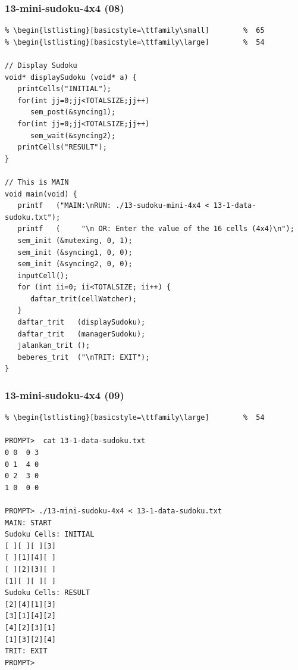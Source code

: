 \documentclass[aspectratio=169, xcolor=table, notheorems, hyperref={pdfpagelabels=false}]{beamer}
\begin{document}
\begin{frame}[fragile]
\frametitle{13-mini-sudoku-4x4 (08)}
\begin{lstlisting}[basicstyle=\ttfamily\tiny]         % 108
% \begin{lstlisting}[basicstyle=\ttfamily\footnotesize] %  72
% \begin{lstlisting}[basicstyle=\ttfamily\small]        %  65
% \begin{lstlisting}[basicstyle=\ttfamily\large]        %  54

// Display Sudoku
void* displaySudoku (void* a) {
   printCells("INITIAL");
   for(int jj=0;jj<TOTALSIZE;jj++) 
      sem_post(&syncing1);
   for(int jj=0;jj<TOTALSIZE;jj++) 
      sem_wait(&syncing2);
   printCells("RESULT");
}

// This is MAIN
void main(void) {
   printf   ("MAIN:\nRUN: ./13-sudoku-mini-4x4 < 13-1-data-sudoku.txt");
   printf   (     "\n OR: Enter the value of the 16 cells (4x4)\n");
   sem_init (&mutexing, 0, 1);
   sem_init (&syncing1, 0, 0);
   sem_init (&syncing2, 0, 0);
   inputCell();
   for (int ii=0; ii<TOTALSIZE; ii++) {
      daftar_trit(cellWatcher);
   }
   daftar_trit   (displaySudoku);
   daftar_trit   (managerSudoku);
   jalankan_trit ();
   beberes_trit  ("\nTRIT: EXIT");
}

\end{lstlisting}
\end{frame}

\begin{frame}[fragile]
\frametitle{13-mini-sudoku-4x4 (09)}
\begin{lstlisting}[basicstyle=\ttfamily\footnotesize] %  72
% \begin{lstlisting}[basicstyle=\ttfamily\small]        %  65
% \begin{lstlisting}[basicstyle=\ttfamily\large]        %  54

PROMPT>  cat 13-1-data-sudoku.txt 
0 0  0 3
0 1  4 0
0 2  3 0
1 0  0 0

PROMPT> ./13-mini-sudoku-4x4 < 13-1-data-sudoku.txt
MAIN: START
Sudoku Cells: INITIAL
[ ][ ][ ][3]
[ ][1][4][ ]
[ ][2][3][ ]
[1][ ][ ][ ]
Sudoku Cells: RESULT
[2][4][1][3]
[3][1][4][2]
[4][2][3][1]
[1][3][2][4]
TRIT: EXIT
PROMPT>

\end{lstlisting}
\end{frame}
\end{document}
